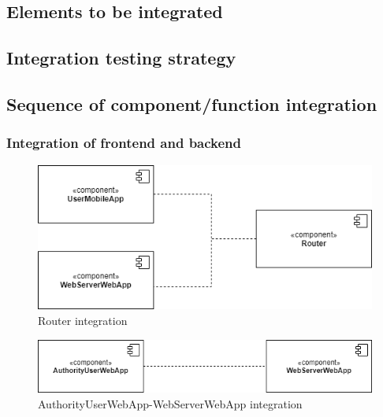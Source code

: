         \subsection{Elements to be integrated}
        \subsection{Integration testing strategy}
        \subsection{Sequence of component/function integration}

        \subsubsection{Integration of frontend and backend}
            \begin{figure}[H]
                \includegraphics[scale=0.7]{dd/resources/images/Integration-Router.png}
                \caption{Router integration}        
            \end{figure}
            \begin{figure}[H]
                \includegraphics[scale=0.65]{dd/resources/images/Integration-Web.png}
                \caption{AuthorityUserWebApp-WebServerWebApp integration}        
            \end{figure}

